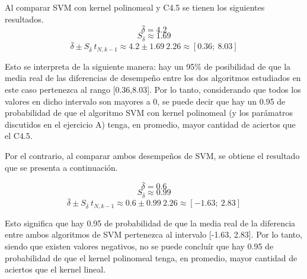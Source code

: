 \documentclass[12pt, a4paper]{article}
\begin{document}
\bigskip

Al comparar SVM con kernel polinomeal y C4.5 se tienen los siguientes resultados. \\

\[  \bar{\delta}  = 4.2 \]
\[    S_{\bar{\delta}} \approx 1.69 \]
\[ \bar{\delta} \pm  S_{\bar{\delta}} \  t_{N,k-1}  \approx 4.2 \pm 1.69 \  2.26  \approx [0.36; \ 8.03 ] \]

Esto se interpreta de la siguiente manera: hay un 95\% de posibilidad de que la media real de las diferencias de desempeño entre los dos algoritmos estudiados en este caso pertenezca al rango [0.36,8.03]. Por lo tanto, considerando que todos los valores en dicho intervalo son mayores a 0, se puede decir que hay un 0.95 de probabilidad de que el algoritmo SVM con kernel polinomeal (y los parámatros discutidos en el ejercicio A) tenga, en promedio, mayor cantidad de aciertos que el C4.5.\\

\bigskip

Por el contrario, al comparar ambos desempeños de SVM, se obtiene el resultado que se presenta a continuación. 

\[  \bar{\delta}  = 0.6 \]
\[    S_{\bar{\delta}} \approx 0.99 \]
\[ \bar{\delta} \pm S_{\bar{\delta}} \  t_{N,k-1}  \approx 0.6 \pm 0.99 \  2.26  \approx [-1.63; \ 2.83 ] \]

Esto significa que hay 0.95 de probabilidad de que la media real de la diferencia entre ambos algoritmos de SVM pertenezca al intervalo [-1.63, 2.83]. Por lo tanto, siendo que existen valores negativos, no se puede concluír que hay 0.95 de probabilidad de que el kernel polinomeal tenga, en promedio, mayor cantidad de aciertos que el kernel lineal.
\end{document}
